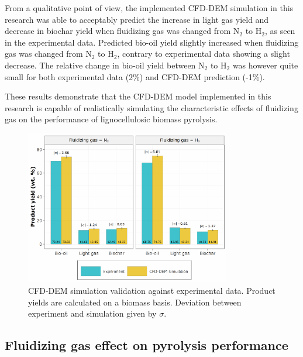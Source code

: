 From a qualitative point of view, the implemented CFD-DEM simulation in this research was able to acceptably predict the increase in light gas yield and decrease in biochar yield when fluidizing gas was changed from N$_2$ to H$_2$, as seen in the experimental data. Predicted bio-oil yield slightly increased when fluidizing gas was changed from N$_2$ to H$_2$, contrary to experimental data showing a slight decrease. The relative change in bio-oil yield between N$_2$ to H$_2$ was however quite small for both experimental data (2\%) and CFD-DEM prediction (-1\%).

These results demonstrate that the CFD-DEM model implemented in this research is capable of realistically simulating the characteristic effects of fluidizing gas on the performance of lignocellulosic biomass pyrolysis.

\begin{figure}[H]
    \centering
    \includegraphics[width=0.8\textwidth]{figures/cfd-validation.pdf}
    \caption{CFD-DEM simulation validation against experimental data. Product yields are calculated on a biomass basis. Deviation between experiment and simulation given by $\sigma$.}
    \label{fig:cfd-validation}
\end{figure}


\subsection{Fluidizing gas effect on pyrolysis performance}

